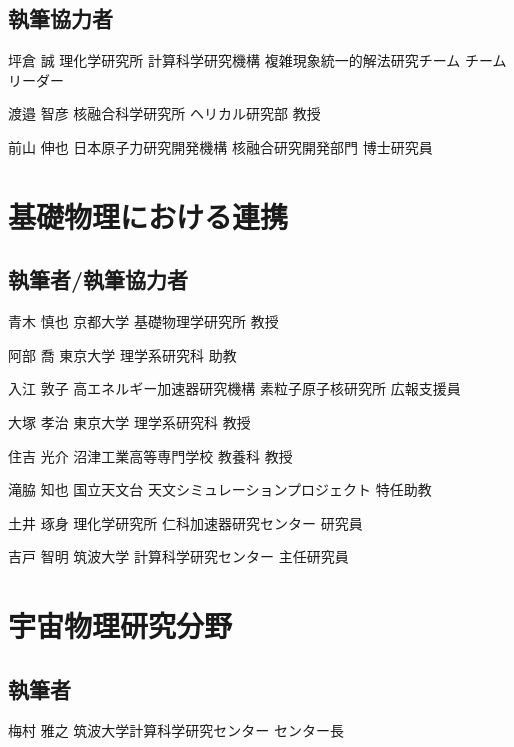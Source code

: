\begin{執筆者一覧}
\subsection{執筆協力者}
\item
{坪倉 誠}
{理化学研究所 計算科学研究機構 複雑現象統一的解法研究チーム}
{チームリーダー}
\item
{渡邉 智彦}
{核融合科学研究所 ヘリカル研究部}
{教授}
\item
{前山 伸也}
{日本原子力研究開発機構 核融合研究開発部門}
{博士研究員}
\section{基礎物理における連携}
\subsection{執筆者/執筆協力者}
\item
{青木 慎也}
{京都大学 基礎物理学研究所}
{教授}
\item
{阿部 喬}
{東京大学 理学系研究科}
{助教}
\item
{入江 敦子}
{高エネルギー加速器研究機構 素粒子原子核研究所}
{広報支援員}
\item
{大塚 孝治}
{東京大学 理学系研究科}
{教授}
\item
{住吉 光介}
{沼津工業高等専門学校 教養科}
{教授}
\item
{滝脇 知也}
{国立天文台 天文シミュレーションプロジェクト}
{特任助教}
\item
{土井 琢身}
{理化学研究所 仁科加速器研究センター}
{研究員}
\item
{吉戸 智明}
{筑波大学 計算科学研究センター}
{主任研究員}
\section{宇宙物理研究分野}
\subsection{執筆者}
\item
{梅村 雅之}
{筑波大学計算科学研究センター}
{センター長}

\end{執筆者一覧}
